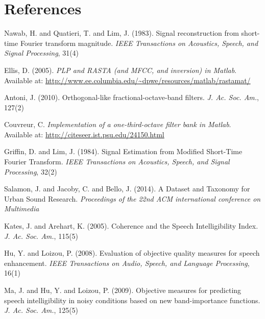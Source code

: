 \documentclass[preprint,12pt]{elsarticle}
\begin{document}
\section{References}
\begin{thebibliography}{09}

Nawab, H. and Quatieri, T. and Lim, J. (1983). Signal reconstruction from short-time Fourier transform magnitude. \textit{IEEE Transactions on Acoustics, Speech, and Signal Processing}, 31(4)

Ellis, D. (2005). \textit{{PLP} and {RASTA} (and {MFCC}, and inversion) in {M}atlab}. Available at: \url{http://www.ee.columbia.edu/~dpwe/resources/matlab/rastamat/}

Antoni, J. (2010). Orthogonal-like fractional-octave-band filters. \textit{J. Ac. Soc. Am.}, 127(2)

Couvreur, C. \textit{Implementation of a one-third-octave filter bank in Matlab}. Available at: \url{http://citeseer.ist.psu.edu/24150.html}

Griffin, D. and Lim, J. (1984). Signal Estimation from Modified Short-Time Fourier Transform. \textit{IEEE Transactions on Acoustics, Speech, and Signal Processing}, 32(2)

Salamon, J. and Jacoby, C. and Bello, J. (2014). A Dataset and Taxonomy for Urban Sound Research. \textit{Proceedings of the 22nd ACM international conference on Multimedia}

Kates, J. and Arehart, K. (2005). Coherence and the Speech Intelligibility Index. \textit{J. Ac. Soc. Am.}, 115(5)

Hu, Y. and Loizou, P. (2008). Evaluation of objective quality measures for speech enhancement. \textit{IEEE Transactions on Audio, Speech, and Language Processing}, 16(1)

Ma, J. and Hu, Y. and Loizou, P. (2009). Objective measures for predicting speech intelligibility in noisy conditions based on new band-importance functions. \textit{J. Ac. Soc. Am.}, 125(5)


\end{thebibliography}
\end{document}
